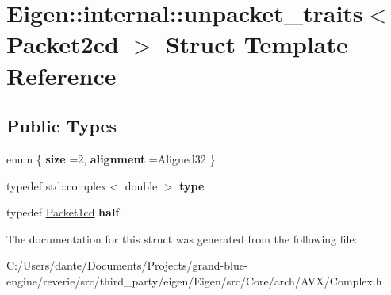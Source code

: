 \hypertarget{struct_eigen_1_1internal_1_1unpacket__traits_3_01_packet2cd_01_4}{}\section{Eigen\+::internal\+::unpacket\+\_\+traits$<$ Packet2cd $>$ Struct Template Reference}
\label{struct_eigen_1_1internal_1_1unpacket__traits_3_01_packet2cd_01_4}
\subsection*{Public Types}
\begin{DoxyCompactItemize}
\item 
\mbox{\label{struct_eigen_1_1internal_1_1unpacket__traits_3_01_packet2cd_01_4_af780dcfe0af519f687461bd49030b4b7}} 
enum \{ {\bfseries size} =2, 
{\bfseries alignment} =Aligned32
 \}
\item 
\mbox{\label{struct_eigen_1_1internal_1_1unpacket__traits_3_01_packet2cd_01_4_a8992ec950a1d1704e1ff6a8e842e2b6d}} 
typedef std\+::complex$<$ double $>$ {\bfseries type}
\item 
\mbox{\label{struct_eigen_1_1internal_1_1unpacket__traits_3_01_packet2cd_01_4_a335b4f8641e621d446ba9c0a1f94217d}} 
typedef \mbox{\hyperlink{struct_eigen_1_1internal_1_1_packet1cd}{Packet1cd}} {\bfseries half}
\end{DoxyCompactItemize}


The documentation for this struct was generated from the following file\+:\begin{DoxyCompactItemize}
\item 
C\+:/\+Users/dante/\+Documents/\+Projects/grand-\/blue-\/engine/reverie/src/third\+\_\+party/eigen/\+Eigen/src/\+Core/arch/\+A\+V\+X/Complex.\+h\end{DoxyCompactItemize}
